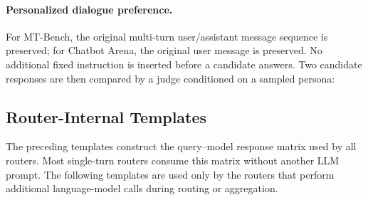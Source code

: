 \paragraph{Personalized dialogue preference.}
For MT-Bench, the original multi-turn user/assistant message sequence is
preserved; for Chatbot Arena, the original user message is preserved. No
additional fixed instruction is inserted before a candidate answers. Two
candidate responses are then compared by a judge conditioned on a sampled
persona:
\begin{mybox}
\footnotesize
{}

\medskip
{}


\medskip
{}
\end{mybox}

\subsection{Router-Internal Templates}

The preceding templates construct the query--model response matrix used by
all routers. Most single-turn routers consume this matrix without another LLM
prompt. The following templates are used only by the routers that perform
additional language-model calls during routing or aggregation.

